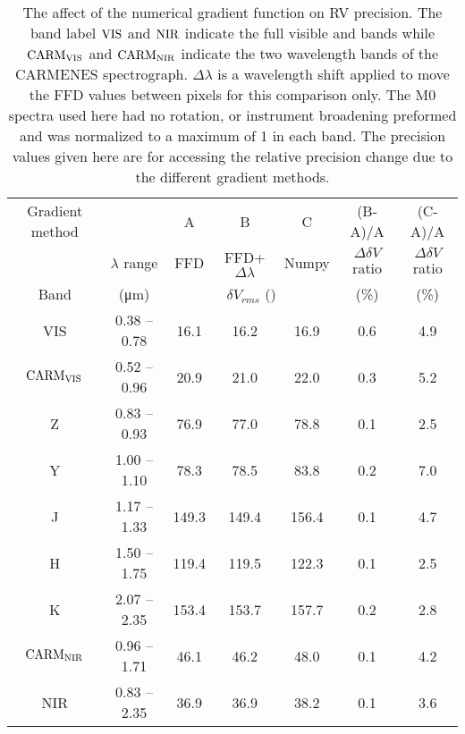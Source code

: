 
\begin{table}
    \centering
    \caption{The affect of the numerical gradient function on {RV} precision.
        The band label \(\rm VIS\) and \(\rm NIR\) indicate the full visible and \nir{} bands while  \(\rm CARM_{VIS}\)  and \(\rm CARM_{NIR}\)  indicate the two wavelength bands of the {CARMENES} spectrograph.
        \(\Delta\lambda\) is a wavelength shift applied to move the FFD values between pixels for this comparison only. 
        The M0 spectra used here had no rotation, or instrument broadening preformed and  was normalized to a maximum of 1 in each band.
        The precision values given here are for accessing the relative precision change due to the different gradient methods.}
    \begin{tabular}{ccccccc}
        \toprule
        Gradient method &  &  A &   B & C & (B-A)/A & (C-A)/A \\
        &   \(\lambda\) range & FFD & FFD+\(\Delta\lambda\) &  Numpy & \(\Delta\delta V\) ratio& \(\Delta\delta V\) ratio\\

        Band  & (\si{\micro\meter}) &\multicolumn{3}{c}{\(\delta V_{rms}\) (\mps{})}  & (\%) & (\%) \\
        \midrule
        VIS & 0.38 -- 0.78 & 16.1 & 16.2 & 16.9  & 0.6 & 4.9\\
        \(\rm CARM_{VIS}\) & 0.52 --  0.96 & 20.9 & 21.0 & 22.0 & 0.3& 5.2 \\
        Z & 0.83 -- 0.93 & 76.9 & 77.0 & 78.8  & 0.1 & 2.5\\
        Y & 1.00 -- 1.10 & 78.3 & 78.5 & 83.8 & 0.2 & 7.0 \\
        J & 1.17 -- 1.33 & 149.3 & 149.4 & 156.4 & 0.1 & 4.7 \\
        H & 1.50 -- 1.75 & 119.4 & 119.5 & 122.3 & 0.1 & 2.5 \\
        K & 2.07 -- 2.35 & 153.4 & 153.7 & 157.7  & 0.2 & 2.8\\
        \(\rm CARM_{NIR}\) & 0.96 -- 1.71 & 46.1 & 46.2 & 48.0 & 0.1& 4.2 \\
        NIR & 0.83 -- 2.35 & 36.9 & 36.9 & 38.2 & 0.1 & 3.6  \\
        \bottomrule
    \end{tabular}\label{tab:numerical_gradients}
\end{table}
